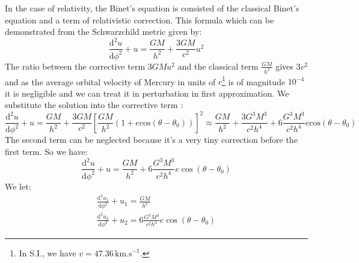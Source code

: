 In the case of relativity, the Binet's equation is consisted of the classical Binet's
equation and a term of relativistic correction. This formula which can be demonstrated from
the Schwarzchild metric given by: 
%
\begin{equation}
	\frac{\mathrm{d}^2u}{\mathrm{d}\phi^2}+u=\frac{GM}{h^2}+\frac{3GM}{c^2}u^2
\end{equation}
%
The ratio between the corrective term $3GMu^2$ and the classical term $\frac{GM}{h^2}$ gives $3v^2$
and as the average orbital velocity of Mercury in units of $c$\footnote{In S.I., we have $v = 47.36 \, \mathrm{km}.\mathrm{s}^{-1}$.} is of magnitude $10^{-4}$ it is negligible and we can
treat it in perturbation in first approximation. We substitute the solution
into the corrective term :
%
\begin{equation}
	\frac{\mathrm{d}^2u}{\mathrm{d}\phi^2}+u=\frac{GM}{h^2}+\frac{3GM}{c^2}
	\left[\frac{GM}{h^2}\left(1+e\mathrm{cos} \left( \theta-\theta_0\right)\right)
	\right] ^2
	\approx \frac{GM}{h^2}+\frac{3G^3M^3}{c^2h^4}+6\frac{G^3M^3}{c^2h^4}e\mathrm{cos}
	\left( \theta-\theta_0\right)
\end{equation}
%
The second term can be neglected because it's a very tiny correction before the first term.
So we have:
\begin{equation}
	\frac{\mathrm{d}^2u}{\mathrm{d}\phi^2}+u=\frac{GM}{h^2}+6\frac{G^3M^3}{c^2h^4}e
	\cos \left( \theta-\theta_0\right)
\end{equation}
%
We let:
%
\begin{equation}
\begin{aligned}
	\frac{\mathrm{d}^2u_1}{\mathrm{d}\phi^2}+u_1=\frac{GM}{h^2}
	\\
	\frac{\mathrm{d}^2u_2}{\mathrm{d}\phi^2}+u_2=6\frac{G^3M^3}{c^2h^4}e\cos
	\left( \theta-\theta_0\right)
\end{aligned}
\end{equation}

